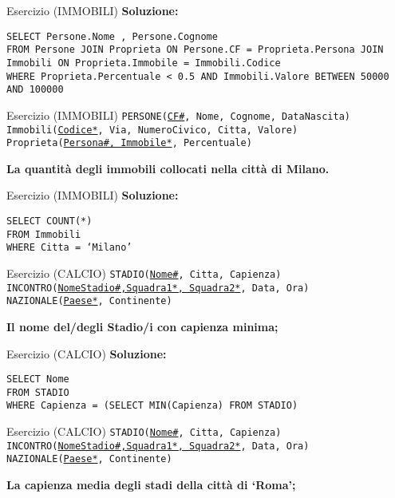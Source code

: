 \begin{frame}{Esercizio (IMMOBILI)}
    \textbf{Soluzione:}
    \vspace{1em}
    
    \texttt{SELECT Persone.Nome , Persone.Cognome\\FROM Persone JOIN Proprieta ON Persone.CF = Proprieta.Persona JOIN Immobili ON Proprieta.Immobile = Immobili.Codice\\WHERE Proprieta.Percentuale < 0.5 AND Immobili.Valore BETWEEN 50000 AND 100000}
\end{frame}
\begin{frame}{Esercizio (IMMOBILI) } 
    \texttt{PERSONE(\underline{CF\#}, Nome, Cognome, DataNascita)\\
    Immobili(\underline{Codice*}, Via, NumeroCivico, Citta, Valore)\\
    Proprieta(\underline{Persona\#, Immobile*}, Percentuale)}
    \vspace{1em}
    
    \textbf{La quantit\`a degli immobili collocati nella citt\`a di Milano.}
\end{frame}

\begin{frame}{Esercizio (IMMOBILI)}
    \textbf{Soluzione:}
    \vspace{1em}
    
    \texttt{SELECT COUNT(*) \\FROM Immobili \\WHERE Citta = `Milano'}
\end{frame}
\begin{frame}{Esercizio (CALCIO) } 
    \texttt{STADIO(\underline{Nome\#}, Citta, Capienza)\\
    INCONTRO(\underline{NomeStadio\#,Squadra1*, Squadra2*}, Data, Ora)\\
    NAZIONALE(\underline{Paese*}, Continente)}
    \vspace{1em}
    
    \textbf{Il nome del/degli Stadio/i con capienza minima;}
\end{frame}

\begin{frame}{Esercizio (CALCIO)}
    \textbf{Soluzione:}
    \vspace{1em}
    
    \texttt{SELECT Nome \\FROM STADIO\\WHERE Capienza = (SELECT MIN(Capienza) FROM STADIO)}
\end{frame}
\begin{frame}{Esercizio (CALCIO) } 
    \texttt{STADIO(\underline{Nome\#}, Citta, Capienza)\\
    INCONTRO(\underline{NomeStadio\#,Squadra1*, Squadra2*}, Data, Ora)\\
    NAZIONALE(\underline{Paese*}, Continente)}
    \vspace{1em}
    
    \textbf{La capienza media degli stadi della citt\`a di `Roma';}
\end{frame}

